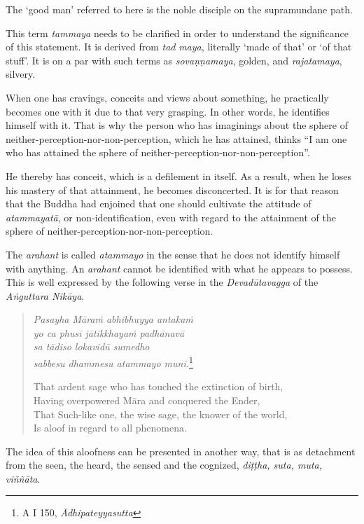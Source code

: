 The `good man' referred to here is the noble disciple on the supramundane path.

This term \emph{tammaya} needs to be clarified in order to understand the significance of this statement. It is derived from \emph{tad} \emph{maya}, literally `made of that' or `of that stuff'. It is on a par with such terms as \emph{sovaṇṇamaya}, golden, and \emph{rajatamaya}, silvery.

When one has cravings, conceits and views about something, he practically becomes one with it due to that very grasping. In other words, he identifies himself with it. That is why the person who has imaginings about the sphere of neither-perception-nor-non-perception, which he has attained, thinks ``I am one who has attained the sphere of neither-perception-nor-non-perception''.

He thereby has conceit, which is a defilement in itself. As a result, when he loses his mastery of that attainment, he becomes disconcerted. It is for that reason that the Buddha had enjoined that one should cultivate the attitude of \emph{atammayatā}, or non-identification, even with regard to the attainment of the sphere of neither-perception-nor-non-perception.

The \emph{arahant} is called \emph{atammayo} in the sense that he does not identify himself with anything. An \emph{arahant} cannot be identified with what he appears to possess. This is well expressed by the following verse in the \emph{Devadūtavagga} of the \emph{Aṅguttara Nikāya}.

\begin{quote}
\emph{Pasayha Māraṁ abhibhuyya antakaṁ}\\
\emph{yo ca phusī jātikkhayaṁ padhānavā}\\
\emph{sa tādiso lokavidū sumedho}\\
\emph{sabbesu dhammesu atammayo muni.}\footnote{A I 150, \emph{Ādhipateyyasutta}}

That ardent sage who has touched the extinction of birth,\\
Having overpowered Māra and conquered the Ender,\\
That Such-like one, the wise sage, the knower of the world,\\
Is aloof in regard to all phenomena.
\end{quote}

The idea of this aloofness can be presented in another way, that is as detachment from the seen, the heard, the sensed and the cognized, \emph{diṭṭha, suta, muta, viññāta}.

